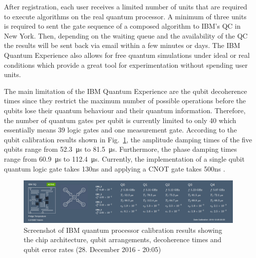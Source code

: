 After registration, each user receives a limited number of units that are required to execute algorithms on the real quantum processor. A minimum of three units is required to sent the gate sequence of a composed algorithm to IBM's QC in New York. Then, depending on the waiting queue and the availability of the QC the results will be sent back via email within a few minutes or days. The IBM Quantum Experience also allows for free quantum simulations under ideal or real conditions which provide a great tool for experimentation without spending user units.

The main limitation of the IBM Quantum Experience are the qubit decoherence times since they restrict the maximum number of possible operations before the qubits lose their quantum behaviour and their quantum information. Therefore, the number of quantum gates per qubit is currently limited to only 40 which essentially means 39 logic gates and one measurement gate. According to the qubit calibration results shown in Fig.~\ref{fig:calibration}, the amplitude damping times of the five qubits range from \SI{52.3}{\micro\second} to \SI{81.5}{\micro\second}. Furthermore, the phase damping times range from \SI{60.9}{\micro\second} to \SI{112.4}{\micro\second}. Currently, the implementation of a single qubit quantum logic gate takes 130ns and applying a CNOT gate takes 500ns \cite{ibmgatetimes}.

\begin{figure}[H]
      \centering
       \includegraphics[scale=0.33]{img/ibmcalibration.png}
       \caption[]{\label{fig:calibration} Screenshot of IBM quantum processor calibration results showing the chip architecture, qubit arrangements, decoherence times and qubit error rates (28. December 2016 - 20:05)\footnotemark[12]}
\end{figure}
